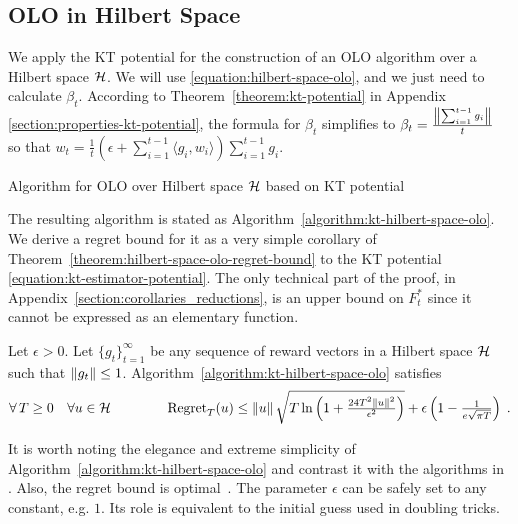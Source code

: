 \vspace{-0.1cm}

\subsection{OLO in Hilbert Space}
\label{section:kt-olo}

We apply the KT potential for the construction of an OLO algorithm over a
Hilbert space $\mathcal{H}$. We will use \eqref{equation:hilbert-space-olo}, and we just
need to calculate $\beta_t$. According to Theorem~\ref{theorem:kt-potential} in
Appendix \ref{section:properties-kt-potential}, the formula for $\beta_t$
simplifies to $\beta_t = \frac{\left\|{\sum_{i=1}^{t-1} g_i}\right\|}{t}$ so that $w_t =
\tfrac{1}{t} \left(\epsilon + \sum_{i=1}^{t-1} \langle g_i, w_i \rangle \right)
\sum_{i=1}^{t-1} g_i$.

\begin{algorithm}[t]
\caption{Algorithm for OLO over Hilbert space $\mathcal{H}$ based on KT potential
\label{algorithm:kt-hilbert-space-olo}}
\begin{algorithmic}[1]
{
\ENDFOR
}
\end{algorithmic}
\end{algorithm}

The resulting algorithm is stated as
Algorithm~\ref{algorithm:kt-hilbert-space-olo}.  We derive a regret bound for
it as a very simple corollary of
Theorem~\ref{theorem:hilbert-space-olo-regret-bound} to the KT potential
\eqref{equation:kt-estimator-potential}. The only technical part of the proof,
in Appendix~\ref{section:corollaries_reductions}, is an upper bound on $F_t^*$
since it cannot be expressed as an elementary function.
%
\begin{corollary}
\label{corollary:kt-hilbert-space-olo-regret} Let $\epsilon > 0$. Let
$\{g_t\}_{t=1}^\infty$ be any sequence of reward vectors in a Hilbert space
$\mathcal{H}$ such that $\left\|{g_t}\right\| \le 1$.
Algorithm~\ref{algorithm:kt-hilbert-space-olo} satisfies
\[
\forall \, T \ge 0 \quad
\forall u \in \mathcal{H} \qquad \qquad
\operatorname{Regret}_T(u) \le \left\|{u}\right\| \sqrt{T \ln\left(1 + \tfrac{24 T^2 \left\|{u}\right\|^2}{\epsilon^2} \right)} + \epsilon \left(1 - \tfrac{1}{e\sqrt{ \pi T}} \right) \;.
\]
\end{corollary}
%
It is worth noting the elegance and extreme simplicity of
Algorithm~\ref{algorithm:kt-hilbert-space-olo} and contrast it with the
algorithms in \cite{Streeter-McMahan-2012, McMahan-Orabona-2014, Orabona-2013,
Orabona-2014}.  Also, the regret bound is
optimal~\cite{Streeter-McMahan-2012,Orabona-2013}.  The parameter $\epsilon$
can be safely set to any constant, e.g. $1$. Its role is equivalent to the
initial guess used in doubling tricks.


